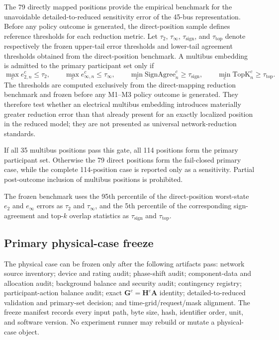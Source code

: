 \documentclass[10pt,journal,onecolumn]{IEEEtran}
\begin{document}
The 79 directly mapped positions provide the empirical benchmark for the
unavoidable detailed-to-reduced sensitivity error of the 45-bus
representation. Before any policy outcome is generated, the direct-position
sample defines reference thresholds for each reduction metric. Let
$\tau_2$, $\tau_\infty$, $\tau_{\mathrm{sign}}$, and $\tau_{\mathrm{top}}$
denote respectively the frozen upper-tail error thresholds and lower-tail
agreement thresholds obtained from the direct-position benchmark. A multibus
embedding is admitted to the primary participant set only if
\begin{equation}
\max_c e_{2,n}^{c}\leq\tau_2,\qquad
\max_c e_{\infty,n}^{c}\leq\tau_\infty,
\qquad
\min_c\mathrm{SignAgree}_{n}^{c}\geq\tau_{\mathrm{sign}},
\qquad
\min_c\mathrm{TopK}_{n}^{c}\geq\tau_{\mathrm{top}}.
\label{eq:report_embedding_gate}
\end{equation}
The thresholds are computed exclusively from the direct-mapping reduction
benchmark and frozen before any M1--M3 policy outcome is generated. They
therefore test whether an electrical multibus embedding introduces materially
greater reduction error than that already present for an exactly localized
position in the reduced model; they are not presented as universal
network-reduction standards.

If all 35 multibus positions pass this gate, all 114 positions form the
primary participant set. Otherwise the 79 direct positions form the
fail-closed primary case, while the complete 114-position case is reported
only as a sensitivity. Partial post-outcome inclusion of multibus positions
is prohibited.

The frozen benchmark uses the 95th percentile of the direct-position
worst-state $e_2$ and $e_\infty$ errors as $\tau_2$ and $\tau_\infty$, and the
5th percentile of the corresponding sign-agreement and top-$k$ overlap
statistics as $\tau_{\mathrm{sign}}$ and $\tau_{\mathrm{top}}$.
\subsection{Primary physical-case freeze}

The physical case can be frozen only after the following artifacts pass:
network source inventory; device and rating audit; phase-shift audit;
component-data and allocation audit; background balance and security audit;
contingency registry; participant-action balance audit; exact
$\bm G^c=\bm H^c\bm A$ identity; detailed-to-reduced validation and primary-set
decision; and time-grid/request/mask alignment. The freeze manifest records
every input path, byte size, hash, identifier order, unit, and software version.
No experiment runner may rebuild or mutate a physical-case object.
\end{document}
